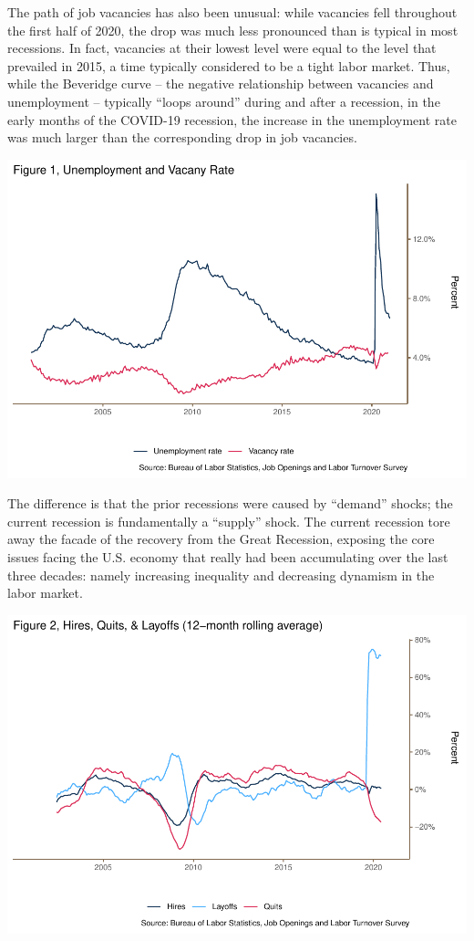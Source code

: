 \documentclass[
  11pt,
]{article}
\begin{document}
The path of job vacancies has also been unusual: while vacancies fell
throughout the first half of 2020, the drop was much less pronounced
than is typical in most recessions. In fact, vacancies at their lowest
level were equal to the level that prevailed in 2015, a time typically
considered to be a tight labor market. Thus, while the Beveridge curve
-- the negative relationship between vacancies and unemployment --
typically ``loops around'' during and after a recession, in the early
months of the COVID-19 recession, the increase in the unemployment rate
was much larger than the corresponding drop in job vacancies.

\begin{center}\includegraphics{JOLTS_files/figure-latex/unnamed-chunk-5-1} \end{center}

The difference is that the prior recessions were caused by ``demand''
shocks; the current recession is fundamentally a ``supply'' shock. The
current recession tore away the facade of the recovery from the Great
Recession, exposing the core issues facing the U.S. economy that really
had been accumulating over the last three decades: namely increasing
inequality and decreasing dynamism in the labor market.

\begin{center}\includegraphics{JOLTS_files/figure-latex/unnamed-chunk-6-1} \end{center}
\end{document}
